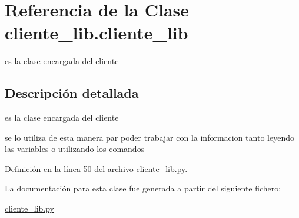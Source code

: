 \hypertarget{classcliente__lib_1_1cliente__lib}{
\section{Referencia de la Clase cliente\_\-lib.cliente\_\-lib}
\label{classcliente__lib_1_1cliente__lib}
}


es la clase encargada del cliente  




\subsection{Descripción detallada}
es la clase encargada del cliente 

se lo utiliza de esta manera par poder trabajar con la informacion tanto leyendo las variables o utilizando los comandos 

Definición en la línea 50 del archivo cliente\_\-lib.py.



La documentación para esta clase fue generada a partir del siguiente fichero:\begin{DoxyCompactItemize}
\item 
\hyperlink{cliente__lib_8py}{cliente\_\-lib.py}\end{DoxyCompactItemize}
